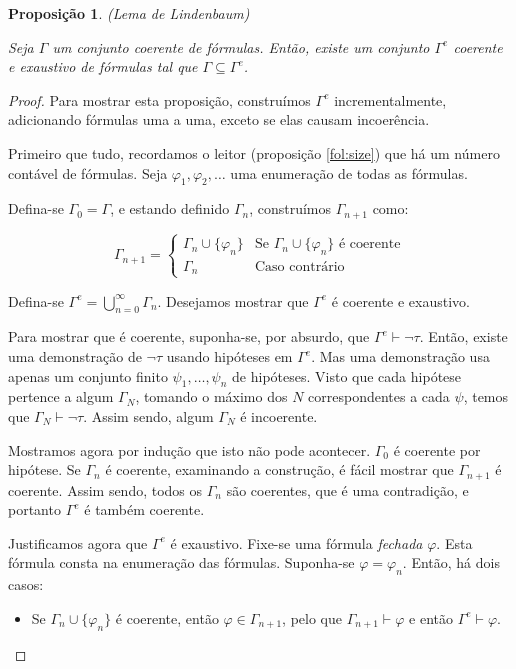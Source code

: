 \documentclass{report}
\newtheorem{prop}{Proposição}
\theoremstyle{definition}
\theoremstyle{remark}
\begin{document}
	\begin{prop}
	(Lema de Lindenbaum)
	
	Seja $\Gamma$ um conjunto coerente de fórmulas. Então, existe um conjunto $\Gamma^e$ coerente e exaustivo de fórmulas tal que $\Gamma \subseteq \Gamma^e$.
	\end{prop}
	
	\begin{proof}
	Para mostrar esta proposição, construímos $\Gamma^e$ incrementalmente, adicionando fórmulas uma a uma, exceto se elas causam incoerência.
	
	Primeiro que tudo, recordamos o leitor (proposição \ref{fol:size}) que há um número contável de fórmulas. Seja $\varphi_1, \varphi_2, \dots$ uma enumeração de todas as fórmulas.
	
	Defina-se $\Gamma_0 = \Gamma$, e estando definido $\Gamma_n$, construímos $\Gamma_{n+1}$ como:
	
	\[\Gamma_{n+1} = \begin{cases}
	\Gamma_n \cup \{\varphi_n\}&\text{Se $\Gamma_n \cup \{\varphi_n\}$ é coerente}\\
	\Gamma_n&\text{Caso contrário}
	\end{cases}\]
	
	Defina-se $\Gamma^e = \bigcup_{n=0}^\infty \Gamma_n$. Desejamos mostrar que $\Gamma^e$ é coerente e exaustivo.
	
	Para mostrar que é coerente, suponha-se, por absurdo, que $\Gamma^e \vdash \neg \tau$. Então, existe uma demonstração de $\neg \tau$ usando hipóteses em $\Gamma^e$. Mas uma demonstração usa apenas um conjunto finito $\psi_1, \dots, \psi_n$ de hipóteses. Visto que cada hipótese pertence a algum $\Gamma_N$, tomando o máximo dos $N$ correspondentes a cada $\psi$, temos que $\Gamma_N \vdash \neg \tau$. Assim sendo, algum $\Gamma_N$ é incoerente.
	
	Mostramos agora por indução que isto não pode acontecer. $\Gamma_0$ é coerente por hipótese. Se $\Gamma_n$ é coerente, examinando a construção, é fácil mostrar que $\Gamma_{n+1}$ é coerente. Assim sendo, todos os $\Gamma_n$ são coerentes, que é uma contradição, e portanto $\Gamma^e$ é também coerente.
	
	Justificamos agora que $\Gamma^e$ é exaustivo. Fixe-se uma fórmula \emph{fechada} $\varphi$. Esta fórmula consta na enumeração das fórmulas. Suponha-se $\varphi = \varphi_n$. Então, há dois casos:
	
	\begin{itemize}
	\item Se $\Gamma_n \cup \{\varphi_n\}$ é coerente, então $\varphi \in \Gamma_{n+1}$, pelo que $\Gamma_{n+1} \vdash \varphi$ e então $\Gamma^e \vdash \varphi$.
	

\end{itemize}
\end{proof}
\end{document}
